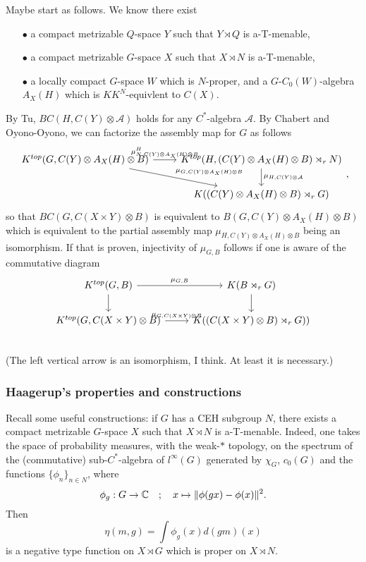 Maybe start as follows. We know there exist
\begin{itemize}
\item[$\bullet$] a compact metrizable $Q$-space $Y$ such that $Y\rtimes Q$ is a-T-menable,
\item[$\bullet$] a compact metrizable $G$-space $X$ such that $X\rtimes N$ is a-T-menable,
\item[$\bullet$] a locally compact $G$-space $W$ which is $N$-proper, and a $G$-$C_0(W)$-algebra $A_X(H)$ which is $KK^N$-equivlent to $C(X)$. 
\end{itemize}
By Tu, $BC(H, C(Y)\otimes\mathcal A)$ holds for any $C^*$-algebra $\mathcal A$. By Chabert and Oyono-Oyono, we can factorize the assembly map for $G$ as follows
\[\begin{tikzcd}
K^{top}(G, C(Y)\otimes A_X(H)\otimes B) \arrow{rd}{\mu_{G, C(Y)\otimes A_X(H)\otimes B}}\arrow{r}{\mu_{N,C(Y)\otimes A_X(H)\otimes B}^H} 
		& K^{top}(H, (C(Y)\otimes A_X(H)\otimes B)\rtimes_r N) \arrow{d}{\mu_{H , C(Y)\otimes \mathcal A}} \\
		& K((C(Y)\otimes A_X(H)\otimes B)\rtimes_r G)\end{tikzcd},\] 
so that $BC(G,C(X\times Y)\otimes B)$ is equivalent to $B(G, C(Y)\otimes A_X(H)\otimes B)$ which is equivalent to the partial assembly map $\mu_{H, C(Y)\otimes A_X(H)\otimes B}$ being an isomorphism. If that is proven, injectivity of $\mu_{G,B}$ follows if one is aware of the commutative diagram
\[\begin{tikzcd}
K^{top}(G,B)\arrow{d} \arrow{r}{\mu_{G,B}} & K(B\rtimes_r G) \arrow{d} \\
K^{top}(G, C(X\times Y)\otimes B) \arrow{r}{ \mu_{G,C(X\times Y)\otimes B} } & K( (C(X\times Y)\otimes B)\rtimes_r G)) \\
\end{tikzcd}\]
(The left vertical arrow is an isomorphism, I think. At least it is necessary.)

\subsubsection*{Haagerup's properties and constructions}
Recall some useful constructions: if $G$ has a CEH subgroup $N$, there exists a compact metrizable $G$-space $X$ such that $X\rtimes N$ is a-T-menable. Indeed, one takes the space of probability measures, with the weak-$*$ topology, on the spectrum of the (commutative) sub-$C^*$-algebra of $l^\infty (G)$ generated by $\chi_G$, $c_0(G)$ and the functions $\{\phi_n\}_{n\in N}$, where
\[\phi_g : G\rightarrow \mathbb C  \quad ;\quad x \mapsto \| \phi(gx) - \phi(x) \|^2. \] 
Then 
\[\eta (m,g) = \int \phi_g(x)d(gm)(x)\]
is a negative type function on $X\rtimes G$ which is proper on $X\rtimes N$.\\

